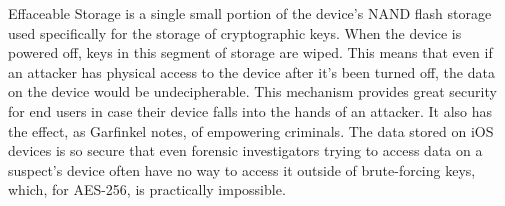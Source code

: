 Effaceable Storage is a single small portion of the device's NAND flash storage
used specifically for the storage of cryptographic keys. When the device is
powered off, keys in this segment of storage are wiped. This means that even if
an attacker has physical access to the device after it's been turned off, the
data on the device would be undecipherable\cite{garfinkel}. This mechanism
provides great security for end users in case their device falls into the hands
of an attacker. It also has the effect, as Garfinkel notes, of empowering
criminals. The data stored on iOS devices is so secure that even forensic
investigators trying to access data on a suspect's device often have no way to
access it outside of brute-forcing keys, which, for AES-256, is practically
impossible.
